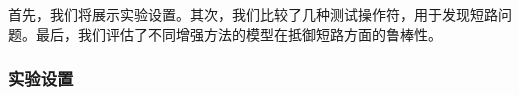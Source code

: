 %		
%		


首先，我们将展示实验设置。其次，我们比较了几种测试操作符，用于发现短路问题。最后，我们评估了不同增强方法的模型在抵御短路方面的鲁棒性。

\subsubsection{实验设置}

